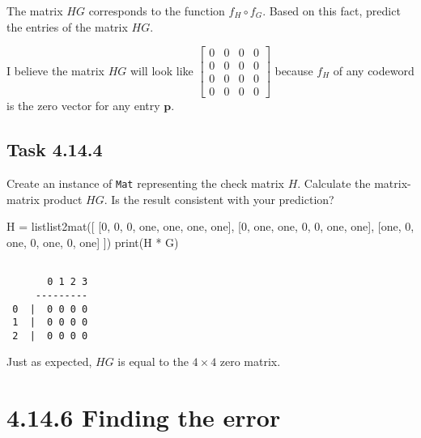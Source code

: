 \documentclass[
  letterpaper,
  DIV=11,
  numbers=noendperiod]{scrartcl}
\newenvironment{Shaded}{\begin{snugshade}}{\end{snugshade}}
\newcommand{\BuiltInTok}[1]{\textcolor[rgb]{0.00,0.23,0.31}{#1}}
\newcommand{\DecValTok}[1]{\textcolor[rgb]{0.68,0.00,0.00}{#1}}
\newcommand{\NormalTok}[1]{\textcolor[rgb]{0.00,0.23,0.31}{#1}}
\newcommand{\OperatorTok}[1]{\textcolor[rgb]{0.37,0.37,0.37}{#1}}
\begin{document}
The matrix \(HG\) corresponds to the function \(f_H \circ f_G\). Based
on this fact, predict the entries of the matrix \(HG\).

I believe the matrix \(HG\) will look like
\(\begin{bmatrix} 0 & 0 & 0 & 0 \\ 0 & 0 & 0 & 0 \\ 0 & 0 & 0 & 0 \\ 0 & 0 & 0 & 0 \end{bmatrix}\)
because \(f_H\) of any codeword is the zero vector for any entry
\(\bm{p}\).

\hypertarget{task-4.14.4}{%
\subsection{Task 4.14.4}\label{task-4.14.4}}

Create an instance of \texttt{Mat} representing the check matrix \(H\).
Calculate the matrix-matrix product \(HG\). Is the result consistent
with your prediction?

\begin{Shaded}
\begin{Highlighting}[numbers=left,,]
\NormalTok{H }\OperatorTok{=}\NormalTok{ listlist2mat([}
\NormalTok{  [}\DecValTok{0}\NormalTok{, }\DecValTok{0}\NormalTok{, }\DecValTok{0}\NormalTok{, one, one, one, one],}
\NormalTok{  [}\DecValTok{0}\NormalTok{, one, one, }\DecValTok{0}\NormalTok{, }\DecValTok{0}\NormalTok{, one, one],}
\NormalTok{  [one, }\DecValTok{0}\NormalTok{, one, }\DecValTok{0}\NormalTok{, one, }\DecValTok{0}\NormalTok{, one]}
\NormalTok{])}
\BuiltInTok{print}\NormalTok{(H }\OperatorTok{*}\NormalTok{ G)}
\end{Highlighting}
\end{Shaded}

\begin{lstlisting}

       0 1 2 3
     ---------
 0  |  0 0 0 0
 1  |  0 0 0 0
 2  |  0 0 0 0
\end{lstlisting}

Just as expected, \(HG\) is equal to the \(4 \times 4\) zero matrix.

\newpage{}

\hypertarget{finding-the-error}{%
\section{4.14.6 Finding the error}\label{finding-the-error}}
\end{document}
